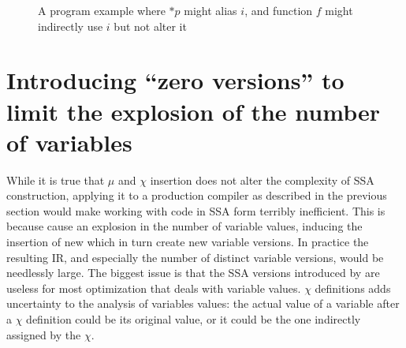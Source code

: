 \begin{figure}
%
%
\caption{\label{fig:hssa:muchi}A program example where $*p$ might alias $i$, and function $f$ might indirectly use $i$ but not alter it}
\end{figure}


\section{Introducing ``zero versions'' to limit the explosion of the number of variables}
While it is true that $\mu$ and $\chi$ insertion does not alter the complexity of SSA construction, applying it to a production compiler as described in the previous section would make working with code in SSA form terribly inefficient.
This is because \chiops cause an explosion in the number of variable values, inducing the insertion of new \phifuns which in turn create new variable versions.
In practice the resulting IR, and especially the number of distinct variable versions, would be needlessly large. The biggest issue is that the SSA versions introduced by \chiops are useless for most optimization that deals with variable values. $\chi$ definitions adds uncertainty to the analysis of variables values: the actual value of a variable after a $\chi$ definition could be its original value, or it could be the one indirectly assigned by the $\chi$.

